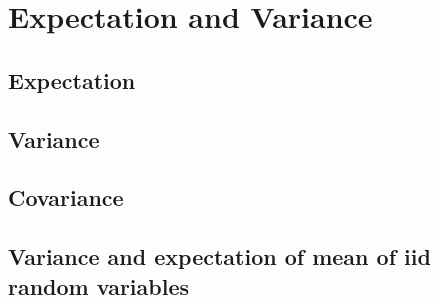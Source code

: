 \section{Expectation and Variance}
\subsection*{Expectation}
\subsection*{Variance}
\subsection*{Covariance}
\subsection*{Variance and expectation of mean of iid random variables}